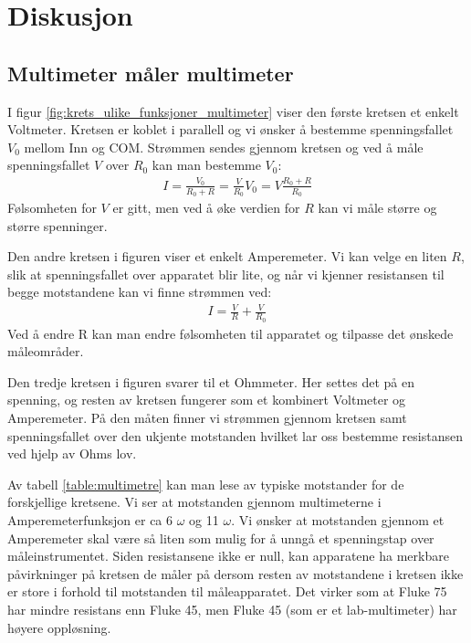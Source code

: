 \documentclass[reprint, english,notitlepage]{revtex4-1}  %
\begin{document}
\section{Diskusjon}

\subsection{Multimeter måler multimeter}

I figur \ref{fig:krets_ulike_funksjoner_multimeter} viser den første kretsen et enkelt Voltmeter. Kretsen er koblet i parallell og vi ønsker å bestemme spenningsfallet $V_0$ mellom Inn og COM. Strømmen sendes gjennom kretsen og ved å måle spenningsfallet $V$ over $R_0$ kan man bestemme $V_0$:
\begin{align*}
  I = \frac{V_0}{R_0 + R} = \frac{V}{R_0}
  V_0 = V \frac{R_0 + R}{R_0}
\end{align*}
Følsomheten for $V$ er gitt, men ved å øke verdien for $R$ kan vi måle større og større spenninger.

Den andre kretsen i figuren viser et enkelt Amperemeter. Vi kan velge en liten $R$, slik at spenningsfallet over apparatet blir lite, og når vi kjenner resistansen til begge motstandene kan vi finne strømmen ved:
\begin{align*}
  I = \frac{V}{R} + \frac{V}{R_0}
\end{align*}
Ved å endre R kan man endre følsomheten til apparatet og tilpasse det ønskede måleområder.

Den tredje kretsen i figuren svarer til et Ohmmeter. Her settes det på en spenning, og resten av kretsen fungerer som et kombinert Voltmeter og Amperemeter. På den måten finner vi strømmen gjennom kretsen samt spenningsfallet over den ukjente motstanden hvilket lar oss bestemme resistansen ved hjelp av Ohms lov.

Av tabell \ref{table:multimetre} kan man lese av typiske motstander for de forskjellige kretsene. Vi ser at motstanden gjennom multimeterne i Amperemeterfunksjon er ca 6 $\omega$ og 11 $\omega$. Vi ønsker at motstanden gjennom et Amperemeter skal være så liten som mulig for å unngå et spenningstap over måleinstrumentet. Siden resistansene ikke er null, kan apparatene ha merkbare påvirkninger på kretsen de måler på dersom resten av motstandene i kretsen ikke er store i forhold til motstanden til måleapparatet. Det virker som at Fluke 75 har mindre resistans enn Fluke 45, men Fluke 45 (som er et lab-multimeter) har høyere oppløsning.
\end{document}
